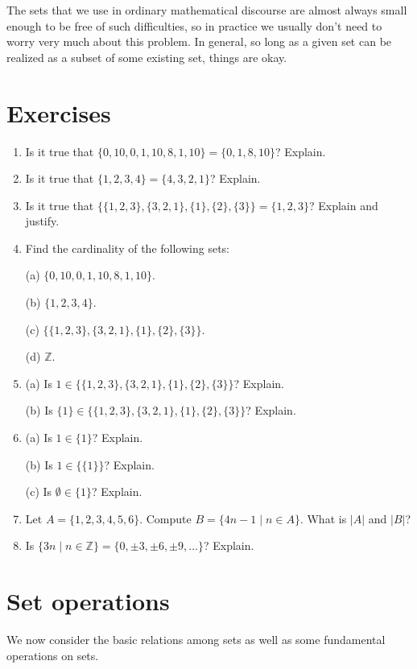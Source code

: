 \documentclass[11pt]{article}
\newenvironment{problems}
{
 \begin{enumerate}[topsep=1pt,itemsep=0pt,parsep=2pt,leftmargin=0.6cm,%
 label={\arabic*.}, ref=\arabic*] \small
}
{
 \end{enumerate}
}
\theoremstyle{definition}
\newcommand{\Z}{\mathbb{Z}} %
\begin{document}
The sets that we use in ordinary mathematical discourse are almost
always small enough to be free of such difficulties, so in practice we
usually don't need to worry very much about this problem. In general,
so long as a given set can be realized as a subset of some existing
set, things are okay.


\section*{Exercises}

\begin{problems}
\item Is it true that $\{0,10,0,1,10,8,1,10\} = \{0, 1, 8, 10\}$?
  Explain.

\item Is it true that $\{1,2,3,4\} = \{4,3,2,1\}$? Explain.

\item Is it true that $\{ \{1,2,3\}, \{3,2,1\}, \{1\}, \{2\}, \{3\} \}
  = \{1,2,3\}$? Explain and justify.

\item Find the cardinality of the following sets:

   (a) $\{0,10,0,1,10,8,1,10\}$.

   (b) $\{1,2,3,4\}$.

   (c) $\{ \{1,2,3\}, \{3,2,1\}, \{1\}, \{2\}, \{3\} \}$.

   (d) $\Z$. 

\item (a) Is $1 \in \{ \{1,2,3\}, \{3,2,1\}, \{1\}, \{2\}, \{3\} \}$?
  Explain. 

  (b) Is $ \{1\} \in \{ \{1,2,3\}, \{3,2,1\}, \{1\}, \{2\}, \{3\} \}$?
  Explain.

\item (a) Is $1 \in \{1\}$? Explain.
  
  (b) Is $1 \in \{\{1\}\}$? Explain.

  (c) Is $\emptyset \in \{1\}$? Explain.


\item Let $A = \{ 1, 2, 3, 4, 5, 6\}$. Compute $B=\{ 4n-1 \mid n \in
  A\}$. What is $|A|$ and $|B|$?

\item Is $\{3n \mid n \in \Z \} = \{0, \pm 3, \pm 6, \pm 9, \dots \}$?
  Explain.


\end{problems}


\newpage\section{Set operations}\noindent
We now consider the basic relations among sets as well as some
fundamental operations on sets.
\end{document}
